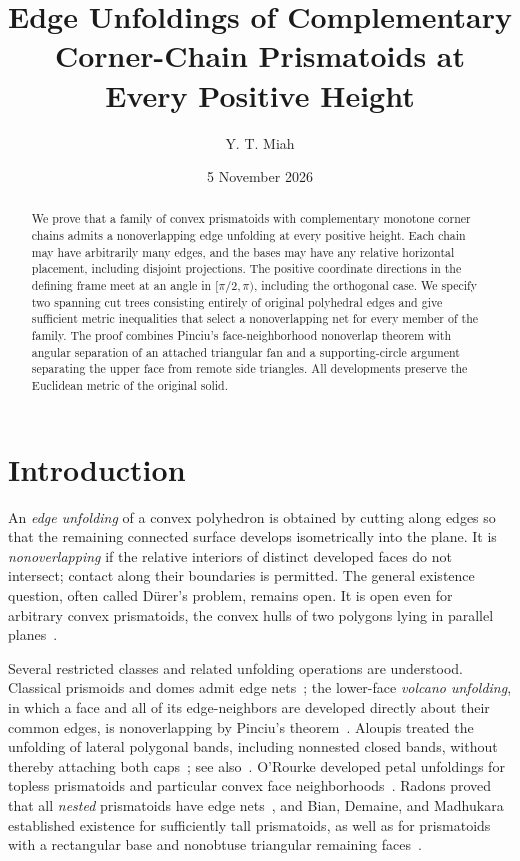 \documentclass[a4paper,11pt]{amsart}
\title[Edge unfoldings of corner-chain prismatoids]{Edge Unfoldings of Complementary\\Corner-Chain Prismatoids at\\Every Positive Height}
\author{Y. T. Miah}
\date{5 November 2026}
\begin{document}
\begin{abstract}
We prove that a family of convex prismatoids with complementary monotone corner chains admits a nonoverlapping edge unfolding at every positive height. Each chain may have arbitrarily many edges, and the bases may have any relative horizontal placement, including disjoint projections. The positive coordinate directions in the defining frame meet at an angle in $[\pi/2,\pi)$, including the orthogonal case. We specify two spanning cut trees consisting entirely of original polyhedral edges and give sufficient metric inequalities that select a nonoverlapping net for every member of the family. The proof combines Pinciu's face-neighborhood nonoverlap theorem with angular separation of an attached triangular fan and a supporting-circle argument separating the upper face from remote side triangles. All developments preserve the Euclidean metric of the original solid.
\end{abstract}
\maketitle

\section{Introduction}
An \emph{edge unfolding} of a convex polyhedron is obtained by cutting along edges so that the remaining connected surface develops isometrically into the plane. It is \emph{nonoverlapping} if the relative interiors of distinct developed faces do not intersect; contact along their boundaries is permitted. The general existence question, often called D\"urer's problem, remains open. It is open even for arbitrary convex prismatoids, the convex hulls of two polygons lying in parallel planes~\cite{ORourke2013,BianDemaineMadhukara2021}.

Several restricted classes and related unfolding operations are understood. Classical prismoids and domes admit edge nets~\cite[Ch.~22, \S22.5]{DemaineORourke2007}; the lower-face \emph{volcano unfolding}, in which a face and all of its edge-neighbors are developed directly about their common edges, is nonoverlapping by Pinciu's theorem~\cite[Theorem~1]{Pinciu2007}. Aloupis treated the unfolding of lateral polygonal bands, including nonnested closed bands, without thereby attaching both caps~\cite[Chapter~7]{Aloupis2005}; see also~\cite{AloupisEtAl2008}. O'Rourke developed petal unfoldings for topless prismatoids and particular convex face neighborhoods~\cite{ORourke2013}. Radons proved that all \emph{nested} prismatoids have edge nets~\cite{Radons2024}, and Bian, Demaine, and Madhukara established existence for sufficiently tall prismatoids, as well as for prismatoids with a rectangular base and nonobtuse triangular remaining faces~\cite{BianDemaineMadhukara2021}.
\end{document}
